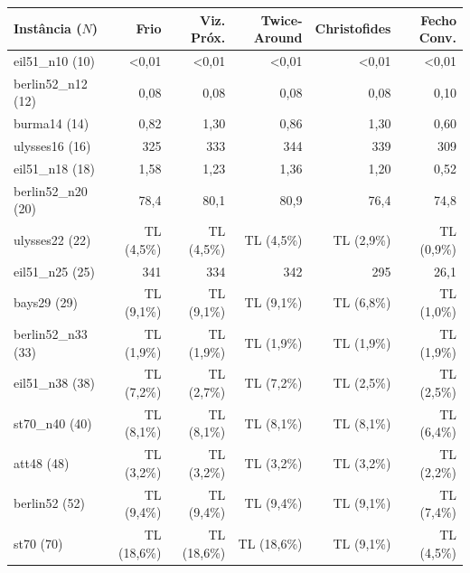 \begin{tabular}{lrrrrr}
\toprule
Instância ($N$) & Frio & Viz. Próx. & Twice-Around & Christofides & Fecho Conv. \\
\midrule
eil51\_n10 (10) & <0,01 & <0,01 & <0,01 & <0,01 & <0,01 \\
berlin52\_n12 (12) & 0,08 & 0,08 & 0,08 & 0,08 & 0,10 \\
burma14 (14) & 0,82 & 1,30 & 0,86 & 1,30 & 0,60 \\
ulysses16 (16) & 325 & 333 & 344 & 339 & 309 \\
eil51\_n18 (18) & 1,58 & 1,23 & 1,36 & 1,20 & 0,52 \\
berlin52\_n20 (20) & 78,4 & 80,1 & 80,9 & 76,4 & 74,8 \\
ulysses22 (22) & TL (4,5\%) & TL (4,5\%) & TL (4,5\%) & TL (2,9\%) & TL (0,9\%) \\
eil51\_n25 (25) & 341 & 334 & 342 & 295 & 26,1 \\
bays29 (29) & TL (9,1\%) & TL (9,1\%) & TL (9,1\%) & TL (6,8\%) & TL (1,0\%) \\
berlin52\_n33 (33) & TL (1,9\%) & TL (1,9\%) & TL (1,9\%) & TL (1,9\%) & TL (1,9\%) \\
eil51\_n38 (38) & TL (7,2\%) & TL (2,7\%) & TL (7,2\%) & TL (2,5\%) & TL (2,5\%) \\
st70\_n40 (40) & TL (8,1\%) & TL (8,1\%) & TL (8,1\%) & TL (8,1\%) & TL (6,4\%) \\
att48 (48) & TL (3,2\%) & TL (3,2\%) & TL (3,2\%) & TL (3,2\%) & TL (2,2\%) \\
berlin52 (52) & TL (9,4\%) & TL (9,4\%) & TL (9,4\%) & TL (9,1\%) & TL (7,4\%) \\
st70 (70) & TL (18,6\%) & TL (18,6\%) & TL (18,6\%) & TL (9,1\%) & TL (4,5\%) \\
\bottomrule
\end{tabular}
